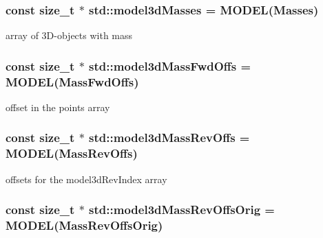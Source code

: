 \hypertarget{namespacestd_a20a6e87f65453b04a7eac93004989039}{}
\subsubsection[{model3d\+Masses}]{\setlength{\rightskip}{0pt plus 5cm}const size\+\_\+t $\ast$ std\+::model3d\+Masses = {\bf M\+O\+D\+E\+L}(Masses)}\label{namespacestd_a20a6e87f65453b04a7eac93004989039}


array of 3\+D-\/objects with mass 

\hypertarget{namespacestd_a22dba9fb8da88b07cd8b471827b6fac7}{}
\subsubsection[{model3d\+Mass\+Fwd\+Offs}]{\setlength{\rightskip}{0pt plus 5cm}const size\+\_\+t $\ast$ std\+::model3d\+Mass\+Fwd\+Offs = {\bf M\+O\+D\+E\+L}(Mass\+Fwd\+Offs)}\label{namespacestd_a22dba9fb8da88b07cd8b471827b6fac7}


offset in the points array 

\hypertarget{namespacestd_acb567e43ad7c5a09fec7eeed5b529d96}{}
\subsubsection[{model3d\+Mass\+Rev\+Offs}]{\setlength{\rightskip}{0pt plus 5cm}const size\+\_\+t $\ast$ std\+::model3d\+Mass\+Rev\+Offs = {\bf M\+O\+D\+E\+L}(Mass\+Rev\+Offs)}\label{namespacestd_acb567e43ad7c5a09fec7eeed5b529d96}


offsets for the model3d\+Rev\+Index array 

\hypertarget{namespacestd_ad0535524d79ce742b34e78404e55a224}{}
\subsubsection[{model3d\+Mass\+Rev\+Offs\+Orig}]{\setlength{\rightskip}{0pt plus 5cm}const size\+\_\+t $\ast$ std\+::model3d\+Mass\+Rev\+Offs\+Orig = {\bf M\+O\+D\+E\+L}(Mass\+Rev\+Offs\+Orig)}\label{namespacestd_ad0535524d79ce742b34e78404e55a224}


